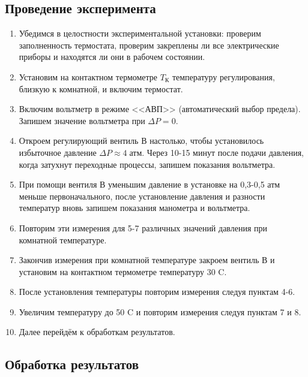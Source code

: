 \documentclass[a4paper,12pt]{article} %
\begin{document}
\subsection{Проведение эксперимента}

\begin{enumerate}
\item Убедимся в целостности экспериментальной установки: проверим заполненность термостата, проверим закреплены  ли все электрические приборы и находятся ли они в рабочем состоянии. 
\item  Установим на контактном термометре  $T_\text{К}$ температуру регулирования, близкую к комнатной, и включим термостат.
\item Включим вольтметр в режиме <<АВП>> (автоматический выбор предела). Запишем значение вольтметра при $\Delta P = 0$.
\item Откроем регулирующий вентиль В настолько, чтобы установилось избыточное давление $\Delta P \approx 4 \; \text{атм}$. Через 10-15 минут после подачи давления, когда затухнут переходные процессы, запишем показания вольтметра.
\item При помощи вентиля В уменьшим давление в установке на 0,3-0,5 атм меньше первоначального, после установление давления и разности температур вновь запишем показания манометра и вольтметра.
\item Повторим эти измерения для 5-7 различных значений давления  при комнатной температуре.
\item Закончив измерения при комнатной температуре закроем вентиль В и установим на контактном термометре температуру 30 \degree C.
\item После установления температуры  повторим измерения следуя пунктам 4-6.
\item Увеличим температуру до 50 \degree C и повторим измерения следуя пунктам 7 и 8.
\item Далее перейдём  к обработкам результатов.
\end{enumerate}

\subsection{Обработка результатов}
\end{document}
